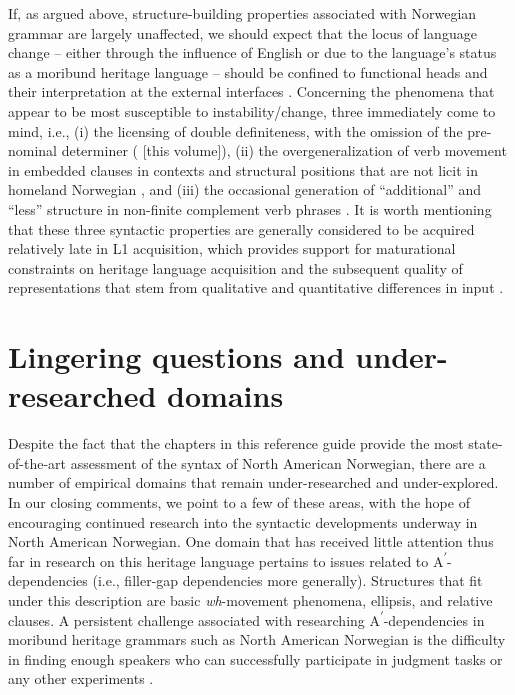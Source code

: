 \documentclass[output=paper,colorlinks,citecolor=brown]{langscibook}
\begin{document}
If, as argued above, structure-building properties associated with Norwegian grammar are largely unaffected, we should expect that the locus of language change -- either through the influence of English or due to the language's status as a moribund heritage language -- should be confined to functional heads and their interpretation at the external interfaces  \citep{LohndalPutnam2021,LohndalPutnam2024,PutnamEtAl2019}. Concerning the phenomena that appear to be most susceptible to instability\slash change, three immediately come to mind, i.e., (i) the licensing of double definiteness, with the omission of the pre-nominal determiner (\citealt{vanBaal2020,vanBaal2024Definiteness,chapters/vanbaal} [this volume]), (ii) the overgeneralization of verb movement in embedded clauses in contexts and structural positions that are not licit in homeland Norwegian , and (iii) the occasional generation of “additional” and “less” structure in non-finite complement verb phrases \citep{PutnamSøfteland2022}. It is worth mentioning that these three syntactic properties are generally considered to be acquired relatively late in L1 acquisition, which provides support for maturational constraints on heritage language acquisition and the subsequent quality of representations that stem from qualitative and quantitative differences in input \citep{Montrul2008,Montrul2016,PerezCortesEtAl2019}. 





\section{Lingering questions and under-researched domains}

Despite the fact that the chapters in this reference guide provide the most state-of-the-art assessment of the syntax of North American Norwegian, there are a number of empirical domains that remain under-researched and under-explored. In our closing comments, we point to a few of these areas, with the hope of encouraging continued research into the syntactic developments underway in North American Norwegian. One domain that has received little attention thus far in research on this heritage language pertains to issues related to A\textsuperscript{$\prime$}-dependencies (i.e., filler-gap dependencies more generally). Structures that fit under this description are basic \textit{wh}-movement phenomena, ellipsis, and relative clauses. A persistent challenge associated with researching A\textsuperscript{$\prime$}-dependencies in moribund heritage grammars such as North American Norwegian is the difficulty in finding enough speakers who can successfully participate in judgment tasks or any other experiments \citep{DAlessandro2021}. 
\end{document}
